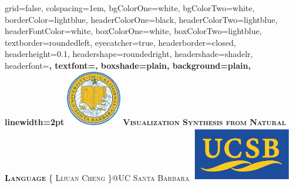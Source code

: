 \documentclass[landscape,final,a0paper,fontscale=0.285]{baposter}
\begin{document}
\begin{poster}%
  {
  grid=false,
  colspacing=1em,
  bgColorOne=white,
  bgColorTwo=white,
  borderColor=lightblue,
  headerColorOne=black,
  headerColorTwo=lightblue,
  headerFontColor=white,
  boxColorOne=white,
  boxColorTwo=lightblue,
  textborder=roundedleft,
  eyecatcher=true,
  headerborder=closed,
  headerheight=0.1\textheight,
  headershape=roundedright,
  headershade=shadelr,
  headerfont=\Large\bf\textsc, %
  textfont={\setlength{\parindent}{1.5em}},
  boxshade=plain,
  background=plain,
  linewidth=2pt
  }
  {\includegraphics[height=6.5em]{images/logo1.jpeg}} 
  {\bf\textsc{Visualization Synthesis from Natural Language}\vspace{0.1em}}
  {\textsc{\{ Lijuan Cheng \}@UC Santa Barbara}}
  {%
    \includegraphics[height=6.5em]{images/logo2.png}
  }

    \newcommand{\colouredcircle}{%
      \tikz{\useasboundingbox (-0.2em,-0.32em) rectangle(0.2em,0.32em); \draw[draw=black,fill=lightblue,line width=0.03em] (0,0) circle(0.18em);}}


\end{poster}
\end{document}
